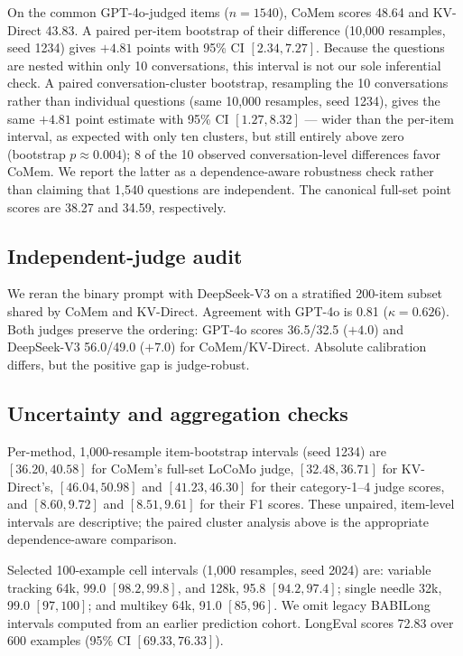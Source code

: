 On the common GPT-4o-judged items ($n{=}1540$), CoMem scores 48.64 and KV-Direct
43.83. A paired per-item bootstrap of their difference (10,000 resamples,
seed 1234) gives $+4.81$ points with 95\% CI $[2.34,7.27]$. Because the questions
are nested within only 10 conversations, this interval is not our sole
inferential check. A paired conversation-cluster bootstrap, resampling the 10
conversations rather than individual questions (same 10,000 resamples,
seed 1234), gives the same $+4.81$ point estimate with 95\% CI $[1.27,8.32]$ ---
wider than the per-item interval, as expected with only ten clusters, but still
entirely above zero (bootstrap $p\approx0.004$); 8 of the 10 observed
conversation-level differences favor CoMem. We report the latter as a
dependence-aware robustness check rather than claiming that 1,540 questions are
independent. The canonical full-set point
scores are 38.27 and 34.59, respectively.

\FloatBarrier
\subsection{Independent-judge audit}
We reran the binary prompt with DeepSeek-V3 on a stratified 200-item subset
shared by CoMem and KV-Direct. Agreement with GPT-4o is 0.81
($\kappa=0.626$). Both judges preserve the ordering: GPT-4o scores
36.5/32.5 ($+4.0$) and DeepSeek-V3 56.0/49.0 ($+7.0$) for CoMem/KV-Direct.
Absolute calibration differs, but the positive gap is judge-robust.

\subsection{Uncertainty and aggregation checks}
Per-method, 1,000-resample item-bootstrap intervals (seed 1234) are
$[36.20,40.58]$ for CoMem's full-set LoCoMo judge, $[32.48,36.71]$ for
KV-Direct's, $[46.04,50.98]$ and $[41.23,46.30]$ for their category-1--4 judge
scores, and $[8.60,9.72]$ and $[8.51,9.61]$ for their F1 scores. These unpaired,
item-level intervals are descriptive; the paired cluster analysis above is the
appropriate dependence-aware comparison.

Selected 100-example cell intervals (1,000 resamples, seed 2024) are: variable
tracking 64k, 99.0 $[98.2,99.8]$, and 128k, 95.8 $[94.2,97.4]$; single needle
32k, 99.0 $[97,100]$; and multikey 64k, 91.0 $[85,96]$. We omit legacy
BABILong intervals computed from an earlier prediction cohort. LongEval scores
72.83 over 600 examples (95\% CI $[69.33,76.33]$).
